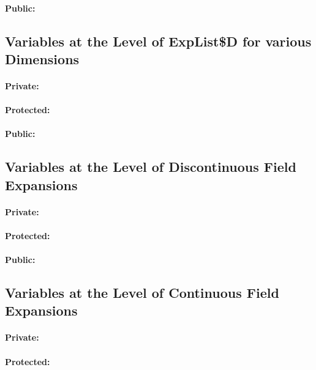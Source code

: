 \paragraph{Public:}


\subsection{Variables at the Level of ExpList\$D for various Dimensions}

\paragraph{Private:}

\paragraph{Protected:}

\paragraph{Public:}


\subsection{Variables at the Level of Discontinuous Field Expansions}

\paragraph{Private:}

\paragraph{Protected:}

\paragraph{Public:}


\subsection{Variables at the Level of Continuous Field Expansions}

\paragraph{Private:}

\paragraph{Protected:}



